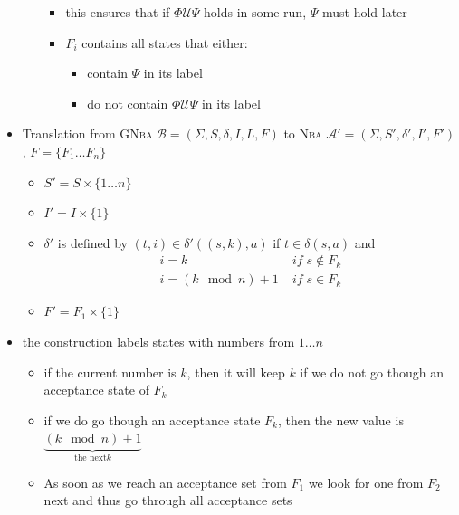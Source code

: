 \documentclass[a4paper, 10pt]{article}
\begin{document}
\begin{itemize}
\begin{itemize}
\begin{itemize}
            \item this ensures that if $\Phi \mathcal{U}\Psi$ holds in some run, $\Psi$ must hold later
            \item $F_i$ contains all states that either:
            \begin{itemize}
                \item contain $\Psi$ in its label
                \item do not contain $\Phi \mathcal{U}\Psi$ in its label
            \end{itemize}
        \end{itemize}
    \end{itemize}
    \item Translation from \textsc{GNba} $\mathcal{B}=(\Sigma,S,\delta,I,L,F)$ to \textsc{Nba} $\mathcal{A}'=(\Sigma,S',\delta',I',F')$, $F=\{ F_1\dots F_n \}$
    \begin{itemize}
        \item $S'=S\times\{1\dots n\}$
        \item $I'=I\times\{1\}$
        \item $\delta'$ is defined by $(t,i)\in\delta'((s,k),a)$ if $t\in\delta(s,a)$ and
        \begin{align*}
        i=k             & \; if\;s\not\in F_k \\
        i=(k \mod n) +1 & \; if\;s    \in F_k
        \end{align*}
        \item $F'=F_1\times\{1\}$
    \end{itemize}
    \item the construction labels states with numbers from $1\dots n$
    \begin{itemize}
        \item if the current number is $k$, then it will keep $k$ if we do not go though an acceptance state of $F_k$
        \item if we do go though an acceptance state $F_k$, then the new value is $\underset{\textrm{the next} k}{\underbrace{(k \mod n)+1}}$
        \item As soon as we reach an acceptance set from $F_1$ we look for one from $F_2$ next and thus go through all acceptance sets
    \end{itemize}
\end{itemize}
\end{document}
